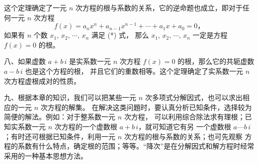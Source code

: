 这个定理确定了一元 $n$ 次方程的根与系数的关系，它的逆命题也成立，即对于任何一元 $n$ 次方程
$$ f(x) = a_n x^n + a_{n-1}x^{n-1} + \cdots + a_1x + a_0 = 0 \text{，} $$
如果有 $n$ 个数 $x_1,\, x_2,\, \cdots,\, x_n$ 满足 (*) 式，
那么 $x_1,\, x_2,\, \cdots,\, x_n$ 一定是方程 $f(x) = 0$ 的根。


八、如果虚数 $a + b\,i$ 是实系数一元 $n$ 次方程 $f(x) = 0$ 的根，那么它的共轭虚数 $a - b\,i$
也是这个方程的根， 并且它们的重数相等。这个定理确定了实系数一元 $n$ 次方程虚根成对的性质。

九、根据本章的知识，我们可以把某些一元 $n$ 次多项式分解因式，也可以求出相应的一元 $n$ 次方程的解集。
在解决这类问題时，要认真分析已知条件，选择较为简便的解法。例如：对于整系数一元 $n$ 次方程，
可以利用综合除法求有理根；已知实系数一元 $n$ 次方程的一个虚数根 $a + b\,i$，就可知道它有另
一个虚数根 $a — b\,i$；有时还可根据已知条件，利用一元 $n$ 次方程的根与系数的关系；也可先观察
方程的系数有什么特点，确定根的范围；等等。“降次”是在分解因式和解方程时经常采用的一种基本思想方法。

